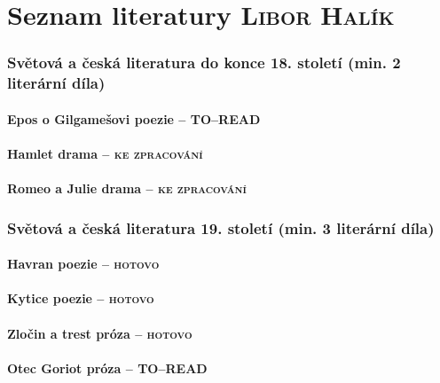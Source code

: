 \documentclass[A4paper]{extarticle} %
\begin{document}

\part*{Seznam literatury {\hfill \normalfont\tiny\textsc{Libor Halík}}}

\section*{Světová a česká literatura do konce 18. století {\tiny{(min. 2 literární díla)}}}

\subsection*{Epos o Gilgamešovi {\tiny{poezie  -- \textsc{TO--READ}}}}

\subsection*{Hamlet {\tiny{drama  -- \textsc{ke zpracování}}}}

\subsection*{Romeo a Julie {\tiny{drama  -- \textsc{ke zpracování}}}}

\section*{Světová a česká literatura 19. století {\tiny{(min. 3 literární díla)}}}

\subsection*{Havran {\tiny{poezie  -- \textsc{hotovo}}}}

\subsection*{Kytice {\tiny{poezie  -- \textsc{hotovo}}}}

\subsection*{Zločin a trest {\tiny{próza  -- \textsc{hotovo}}}}

\subsection*{Otec Goriot {\tiny{próza  -- \textsc{TO--READ}}}}
\end{document}
